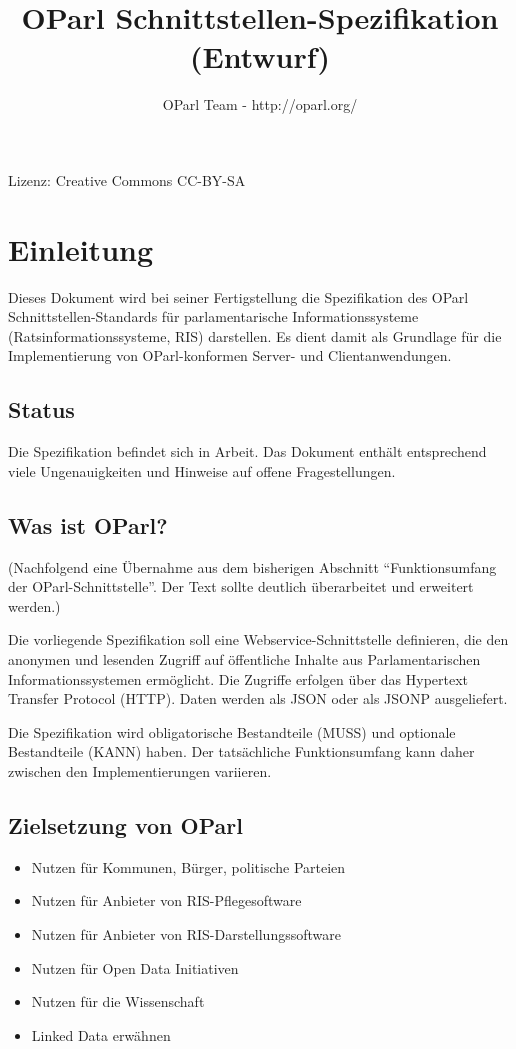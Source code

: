\documentclass[,a4paper]{article}
\title{OParl Schnittstellen-Spezifikation (Entwurf)}
\author{OParl Team - http://oparl.org/}
\date{}
\begin{document}
\maketitle

Lizenz: Creative Commons CC-BY-SA

\section{Einleitung}\label{einleitung}

Dieses Dokument wird bei seiner Fertigstellung die Spezifikation des
OParl Schnittstellen-Standards für parlamentarische Informationssysteme
(Ratsinformationssysteme, RIS) darstellen. Es dient damit als Grundlage
für die Implementierung von OParl-konformen Server- und
Clientanwendungen.

\subsection{Status}\label{status}

Die Spezifikation befindet sich in Arbeit. Das Dokument enthält
entsprechend viele Ungenauigkeiten und Hinweise auf offene
Fragestellungen.

\subsection{Was ist OParl?}\label{was-ist-oparl}

(Nachfolgend eine Übernahme aus dem bisherigen Abschnitt
``Funktionsumfang der OParl-Schnittstelle''. Der Text sollte deutlich
überarbeitet und erweitert werden.)

Die vorliegende Spezifikation soll eine Webservice-Schnittstelle
definieren, die den anonymen und lesenden Zugriff auf öffentliche
Inhalte aus Parlamentarischen Informationssystemen ermöglicht. Die
Zugriffe erfolgen über das Hypertext Transfer Protocol (HTTP). Daten
werden als JSON oder als JSONP ausgeliefert.

Die Spezifikation wird obligatorische Bestandteile (MUSS) und optionale
Bestandteile (KANN) haben. Der tatsächliche Funktionsumfang kann daher
zwischen den Implementierungen variieren.

\subsection{Zielsetzung von OParl}\label{zielsetzung-von-oparl}

\begin{itemize}
\itemsep1pt\parskip0pt
\item
  Nutzen für Kommunen, Bürger, politische Parteien
\item
  Nutzen für Anbieter von RIS-Pflegesoftware
\item
  Nutzen für Anbieter von RIS-Darstellungssoftware
\item
  Nutzen für Open Data Initiativen
\item
  Nutzen für die Wissenschaft
\item
  Linked Data erwähnen
\end{itemize}
\end{document}
